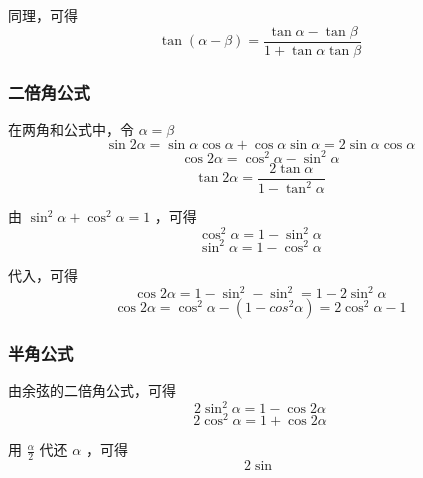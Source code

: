 同理，可得
\begin{equation}
\tan(\alpha-\beta) = \frac{\tan\alpha - \tan\beta}{1 + \tan\alpha\tan\beta}
\end{equation}

\subsubsection{二倍角公式}
在两角和公式中，令 $\alpha = \beta$
\begin{equation}
\sin2\alpha = \sin\alpha \cos\alpha+\cos\alpha \sin\alpha = 2\sin\alpha \cos\alpha
\end{equation}
\begin{equation}
\cos2\alpha = \cos^2\alpha - \sin^2\alpha
\end{equation}
\begin{equation}
\tan2\alpha = \frac{2\tan\alpha}{1 - \tan^2\alpha}
\end{equation}

由 $\sin^2\alpha + \cos^2\alpha = 1$ ，可得
\begin{equation}
\cos^2\alpha = 1 - \sin^2\alpha
\end{equation}
\begin{equation}
\sin^2\alpha = 1 - \cos^2\alpha
\end{equation}

代入，可得
\begin{equation}
\cos2\alpha = 1 - \sin^2 - \sin^2 = 1 - 2\sin^2\alpha
\end{equation}
\begin{equation}
\cos2\alpha = \cos^2\alpha - (1 - cos^2\alpha) = 2\cos^2\alpha - 1
\end{equation}

\subsubsection{半角公式}
由余弦的二倍角公式，可得
\begin{equation}
2\sin^2\alpha = 1 - \cos2\alpha
\end{equation}
\begin{equation}
2\cos^2\alpha = 1 + \cos2\alpha
\end{equation}

用 $\frac{\alpha}{2}$ 代还 $\alpha$ ，可得
\begin{equation}
2\sin 
\end{equation}